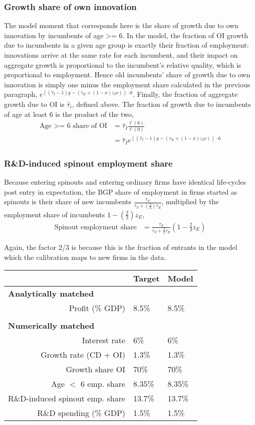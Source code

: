 \documentclass[11pt,english]{article}
\theoremstyle{remark}
\begin{document}
\subsubsection{Growth share of own innovation}

The model moment that corresponds here is the share of growth due to own innovation by incumbents of age >= 6. In the model, the fraction of OI growth due to incumbents in a given age group is exactly their fraction of employment: innovations arrive at the same rate for each incumbent, and their impact on aggregate growth is proportional to the incumbent's relative quality, which is proportional to employment. Hence old incumbents' share of growth due to own innovation is simply one minus the employment share calculated in the previous paragraph, $e^{((\hat{\tau}_I -1)g - (\tau_E + (1-x)z_I \nu))\cdot 6}$. Finally, the fraction of aggregate growth due to OI is $\hat{\tau}_i$, defined above. The fraction of growth due to incumbents of age at least 6 is the product of the two, 
\begin{align*}
\textrm{Age >= 6 share of OI} &= \hat{\tau}_I \frac{\ell(6)}{\ell(0)} \\
 &= \hat{\tau}_I e^{((\hat{\tau}_I -1)g - (\tau_E + (1-x)z_I \nu))\cdot 6} 
\end{align*}

\subsubsection{R\&D-induced spinout employment share}

Because entering spinouts and entering ordinary firms have identical life-cycles post entry in expectation, the BGP share of employment in firms started as spinouts is their share of new incumbents $\frac{\tau_S}{\tau_S+ (\frac{2}{3})\tau_E}$, multiplied by the employment share of incumbents $1- (\frac{2}{3})z_E$, 
\begin{align*}
	\textrm{Spinout employment share} &= \frac{\tau_S}{\tau_S + \frac{2}{3}\tau_E} (1 - \frac{2}{3}z_E) 
\end{align*}

Again, the factor 2/3 is because this is the fraction of entrants in the model which the calibration maps to new firms in the data.


\begin{table}[]
	\centering
	\label{calibration_targets}
	\begin{tabular}{rll}
		\toprule \toprule
		& Target & Model \tabularnewline
		\midrule
		\multicolumn{1}{l}{\textbf{Analytically matched}} & & 
		\tabularnewline
		Profit (\% GDP) & 8.5\% & 8.5\% 
		\tabularnewline
		\tabularnewline
		\multicolumn{1}{l}{\textbf{Numerically matched}} & & 
		\tabularnewline
		Interest rate & 6\% & 6\% 
		\tabularnewline
		Growth rate (CD + OI) & 1.3\% & 1.3\%
		\tabularnewline		
		Growth share OI & 70\% & 70\%
		\tabularnewline
		Age $<$ 6 emp. share  & 8.35\% & 8.35\%
		\tabularnewline
		R\&D-induced spinout emp. share & 13.7\% & 13.7\%
		\tabularnewline
		R\&D spending (\% GDP) & 1.5\% & 1.5\%
		\tabularnewline
		\bottomrule
	\end{tabular}
\end{table}
\end{document}
